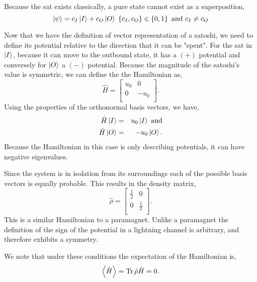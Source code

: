 \documentclass[review,12pt]{elsarticle}
\DeclareMathOperator{\Tr}{\mathrm{Tr}}
\begin{document}
Because the sat exists classically, a pure state cannot exist as a superposition,
\begin{equation}
  \Ket{\psi} = c_I\Ket{I} + c_O\Ket{O} \; \left\{c_I,c_O\right\} \in \left\{0,1\right\} \textrm{ and } c_I \neq c_O \nonumber
\end{equation}

Now that we have the definition of vector representation of a satoshi, we need to define its potential relative to the direction that it can be "spent".
For the sat in $\Ket{I}$, because it can move to the outbound state, it has a $(+)$ potential and conversely for $\Ket{O}$ a $(-)$ potential.
Because the magnitude of the satoshi's value is symmetric, we can define the the Hamiltonian as,
\begin{equation}
  \hat{H} = \left[ {\begin{array}{cc}
          u_0 & 0    \\
          0   & -u_0 \\
        \end{array} } \right].\nonumber
\end{equation}
Using the properties of the orthonormal basis vectors, we have,
\begin{eqnarray}
  \hat{H}\Ket{I} & = & u_0\Ket{I} \textrm{ and} \nonumber\\
  \hat{H}\Ket{O} & = & -u_0\Ket{O}. \nonumber
\end{eqnarray}
Because the Hamiltonian in this case is only describing potentials, it can have negative eigenvalues.

Since the system is in isolation from its surroundings each of the possible basis vectors is equally probable.
This results in the density matrix,
\begin{equation}
  \hat{\rho} = \left[ {\begin{array}{cc}
          \frac{1}{2} & 0           \\
          0           & \frac{1}{2} \\
        \end{array} } \right].\nonumber
\end{equation}
This is a similar Hamiltonian to a paramagnet.
Unlike a paramagnet the definition of the sign of the potential in a lightning channel is arbitrary, and therefore exhibits a symmetry.

We note that under these conditions the expectation of the Hamiltonian is,
\begin{equation}
  \Braket{\hat{H}} = \Tr \hat{\rho}\hat{H} = 0. \nonumber
\end{equation}
\end{document}
